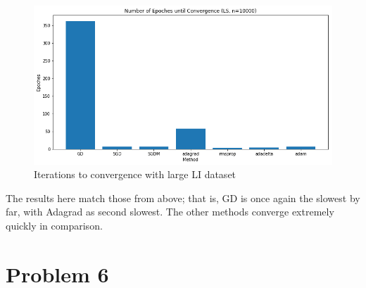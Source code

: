 \documentclass[twoside,11pt]{homework}
\begin{document}
\begin{figure}[H]
		\centering
		\includegraphics[scale=.5]{q5/insep_10000/time.png}
		\caption{Iterations to convergence with large LI dataset}
	\end{figure}

The results here match those from above; that is, GD is once again the slowest by far, with Adagrad as second slowest. The other methods converge extremely quickly in comparison.

\section*{Problem 6}
\end{document}
